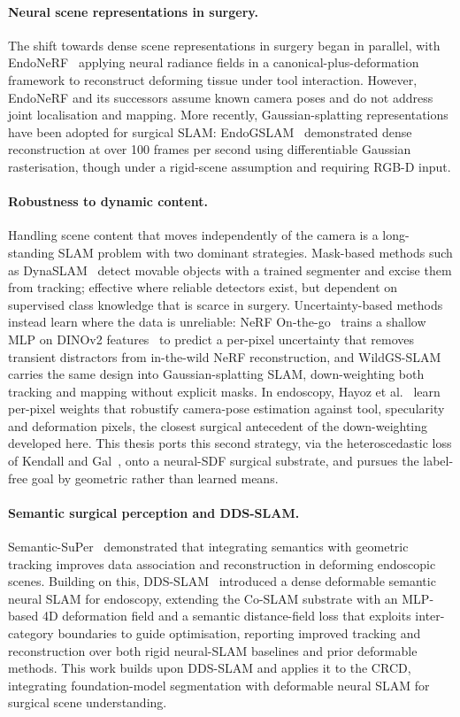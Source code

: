 \documentclass{article}
\begin{document}
\paragraph{Neural scene representations in surgery.}
The shift towards dense scene representations in surgery began in parallel, with EndoNeRF~\cite{Wang2022} applying neural radiance fields in a canonical-plus-deformation framework to reconstruct deforming tissue under tool interaction. However, EndoNeRF and its successors assume known camera poses and do not address joint localisation and mapping. More recently, Gaussian-splatting representations have been adopted for surgical SLAM: EndoGSLAM~\cite{Wang2024} demonstrated dense reconstruction at over 100 frames per second using differentiable Gaussian rasterisation, though under a rigid-scene assumption and requiring RGB-D input.

\paragraph{Robustness to dynamic content.}
Handling scene content that moves independently of the camera is a long-standing SLAM problem with two dominant strategies. Mask-based methods such as DynaSLAM~\cite{Bescos2018} detect movable objects with a trained segmenter and excise them from tracking; effective where reliable detectors exist, but dependent on supervised class knowledge that is scarce in surgery. Uncertainty-based methods instead learn where the data is unreliable: NeRF On-the-go~\cite{Ren2024} trains a shallow MLP on DINOv2 features~\cite{Oquab2023} to predict a per-pixel uncertainty that removes transient distractors from in-the-wild NeRF reconstruction, and WildGS-SLAM~\cite{Zheng2024} carries the same design into Gaussian-splatting SLAM, down-weighting both tracking and mapping without explicit masks. In endoscopy, Hayoz et al.~\cite{Hayoz2023} learn per-pixel weights that robustify camera-pose estimation against tool, specularity and deformation pixels, the closest surgical antecedent of the down-weighting developed here. This thesis ports this second strategy, via the heteroscedastic loss of Kendall and Gal~\cite{KendallGal2017}, onto a neural-SDF surgical substrate, and pursues the label-free goal by geometric rather than learned means.

\paragraph{Semantic surgical perception and DDS-SLAM.}
Semantic-SuPer~\cite{Lin2023} demonstrated that integrating semantics with geometric tracking improves data association and reconstruction in deforming endoscopic scenes. Building on this, DDS-SLAM~\cite{Shan2024} introduced a dense deformable semantic neural SLAM for endoscopy, extending the Co-SLAM substrate with an MLP-based 4D deformation field and a semantic distance-field loss that exploits inter-category boundaries to guide optimisation, reporting improved tracking and reconstruction over both rigid neural-SLAM baselines and prior deformable methods. This work builds upon DDS-SLAM and applies it to the CRCD, integrating foundation-model segmentation with deformable neural SLAM for surgical scene understanding.
\end{document}
